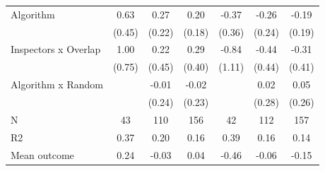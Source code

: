 \begin{tabular}{lccc|ccc}
Algorithm   &        0.63         &        0.27         &        0.20         &       -0.37         &       -0.26         &       -0.19         \\
            &      (0.45)         &      (0.22)         &      (0.18)         &      (0.36)         &      (0.24)         &      (0.19)         \\
\addlinespace
Inspectors x Overlap&        1.00         &        0.22         &        0.29         &       -0.84         &       -0.44         &       -0.31         \\
            &      (0.75)         &      (0.45)         &      (0.40)         &      (1.11)         &      (0.44)         &      (0.41)         \\
\addlinespace
Algorithm x Random&                     &       -0.01         &       -0.02         &                     &        0.02         &        0.05         \\
            &                     &      (0.24)         &      (0.23)         &                     &      (0.28)         &      (0.26)         \\
\midrule
N           &          43         &         110         &         156         &          42         &         112         &         157         \\
R2          &        0.37         &        0.20         &        0.16         &        0.39         &        0.16         &        0.14         \\
Mean outcome&        0.24         &       -0.03         &        0.04         &       -0.46         &       -0.06         &       -0.15         \\
\bottomrule \end{tabular}
